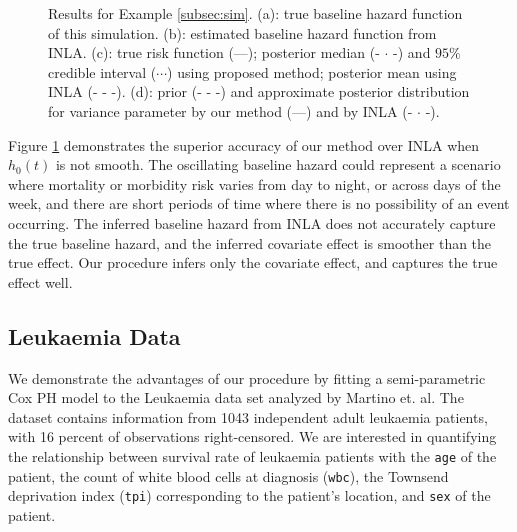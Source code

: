 \documentclass[num-refs,serif,10pt]{wiley-article}
\begin{document}
\begin{figure}[ht]
{}
\caption{Results for Example \ref{subsec:sim}. (a): true baseline hazard function of this simulation. (b): estimated baseline hazard function from INLA. (c): true risk function (---); posterior median (- $\cdot$ -) and $95\%$ credible interval ($\cdots$) using proposed method; posterior mean using INLA (- - -). (d): prior (- - -) and approximate posterior distribution for variance parameter by our method (---) and by INLA (- $\cdot$ -).}
\label{fig:simulation}
\end{figure}

Figure \ref{fig:simulation} demonstrates the superior accuracy of our method over INLA when $h_{0}(t)$ is not smooth. The oscillating baseline hazard could represent a scenario where mortality or morbidity risk varies from day to night, or across days of the week, and there are short periods of time where there is no possibility of an event occurring. The inferred baseline hazard from INLA does not accurately capture the true baseline hazard, and the inferred covariate effect is smoother than the true effect. Our procedure infers only the covariate effect, and captures the true effect well.


\subsection{Leukaemia Data}\label{subsec:leuk}

We demonstrate the advantages of our procedure by fitting a semi-parametric Cox PH model to the Leukaemia data set analyzed by Martino et. al. \cite{inlacoxph} The dataset contains information from 1043 independent adult leukaemia patients, with 16 percent of observations right-censored. We are interested in quantifying the relationship between survival rate of leukaemia patients with the \texttt{age} of the patient, the count of white blood cells at diagnosis (\texttt{wbc}), the Townsend deprivation index (\texttt{tpi}) corresponding to the patient's location, and \texttt{sex} of the patient.
\end{document}
